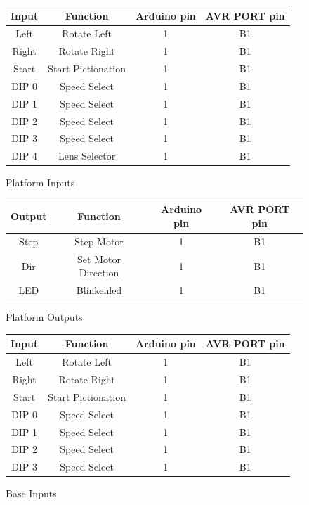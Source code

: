 \documentclass[dvips,12pt]{article}
\begin{document}
\renewcommand{\arraystretch}{1.4}%
\begin{figure}[htb]
\centering
\begin{tabular}{|c|c|c|c|}
\hline
Input&Function&Arduino pin&AVR PORT pin\\
\hline
Left&Rotate Left&1&B1\\
\hline
Right&Rotate Right&1&B1\\
\hline
Start&Start Pictionation&1&B1\\
\hline
DIP 0&Speed Select&1&B1\\
\hline
DIP 1&Speed Select&1&B1\\
\hline
DIP 2&Speed Select&1&B1\\
\hline
DIP 3&Speed Select&1&B1\\
\hline
DIP 4&Lens Selector&1&B1\\
\hline
\end{tabular}
\caption{Platform Inputs}
\label{fig:platforminputs}
\end{figure}

\renewcommand{\arraystretch}{1.4}%
\begin{figure}[htb]
\centering
\begin{tabular}{|c|c|c|c|}
\hline
Output&Function&Arduino pin&AVR PORT pin\\
\hline
Step&Step Motor&1&B1\\
\hline
Dir&Set Motor Direction&1&B1\\
\hline
LED&Blinkenled&1&B1\\
\hline
\end{tabular}
\caption{Platform Outputs}
\label{fig:platformoutputs}
\end{figure}

\renewcommand{\arraystretch}{1.4}%
\begin{figure}[htb]
\centering
\begin{tabular}{|c|c|c|c|}
\hline
Input&Function&Arduino pin&AVR PORT pin\\
\hline
Left&Rotate Left&1&B1\\
\hline
Right&Rotate Right&1&B1\\
\hline
Start&Start Pictionation&1&B1\\
\hline
DIP 0&Speed Select&1&B1\\
\hline
DIP 1&Speed Select&1&B1\\
\hline
DIP 2&Speed Select&1&B1\\
\hline
DIP 3&Speed Select&1&B1\\
\hline
\end{tabular}
\caption{Base Inputs}
\label{fig:baseinputs}
\end{figure}
\end{document}
